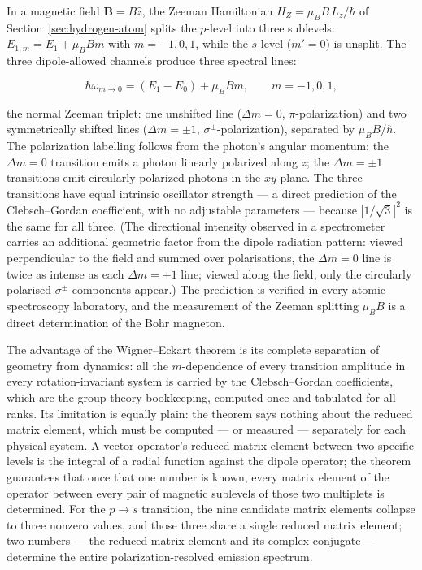 In a magnetic field $\bm B = B\hat{z}$, the Zeeman Hamiltonian $H_Z = \mu_B B\,L_z/\hbar$ of Section~\ref{sec:hydrogen-atom} splits the $p$-level into three sublevels: $E_{1,m} = E_1 + \mu_B B m$ with $m = -1,0,1$, while the $s$-level ($m'=0$) is unsplit. The three dipole-allowed channels produce three spectral lines:
\begin{linenomath}
\begin{equation*}
\hbar\omega_{m\to0} = (E_{1} - E_{0}) + \mu_B B m,\qquad m = -1,0,1,
\end{equation*}
\end{linenomath}
the normal Zeeman triplet: one unshifted line ($\Delta m = 0$, $\pi$-polarization) and two symmetrically shifted lines ($\Delta m = \pm 1$, $\sigma^\pm$-polarization), separated by $\mu_B B/\hbar$. The polarization labelling follows from the photon's angular momentum: the $\Delta m = 0$ transition emits a photon linearly polarized along $z$; the $\Delta m = \pm 1$ transitions emit circularly polarized photons in the $xy$-plane. The three transitions have equal intrinsic oscillator strength --- a direct prediction of the Clebsch--Gordan coefficient, with no adjustable parameters --- because $|1/\sqrt{3}|^2$ is the same for all three. (The directional intensity observed in a spectrometer carries an additional geometric factor from the dipole radiation pattern: viewed perpendicular to the field and summed over polarisations, the $\Delta m=0$ line is twice as intense as each $\Delta m=\pm1$ line; viewed along the field, only the circularly polarised $\sigma^\pm$ components appear.) The prediction is verified in every atomic spectroscopy laboratory, and the measurement of the Zeeman splitting $\mu_B B$ is a direct determination of the Bohr magneton.

The advantage of the Wigner--Eckart theorem is its complete separation of geometry from dynamics: all the $m$-dependence of every transition amplitude in every rotation-invariant system is carried by the Clebsch--Gordan coefficients, which are the group-theory bookkeeping, computed once and tabulated for all ranks. Its limitation is equally plain: the theorem says nothing about the reduced matrix element, which must be computed --- or measured --- separately for each physical system. A vector operator's reduced matrix element between two specific levels is the integral of a radial function against the dipole operator; the theorem guarantees that once that one number is known, every matrix element of the operator between every pair of magnetic sublevels of those two multiplets is determined. For the $p\to s$ transition, the nine candidate matrix elements collapse to three nonzero values, and those three share a single reduced matrix element; two numbers --- the reduced matrix element and its complex conjugate --- determine the entire polarization-resolved emission spectrum.

